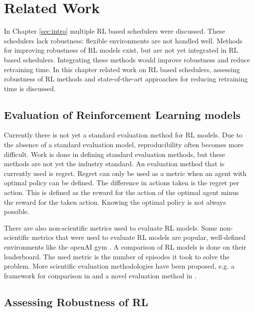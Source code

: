 \chapter{Related Work}

In Chapter \ref{sec:intro} multiple RL based schedulers were discussed. These
schedulers lack robustness: flexible environments are not handled well.
Methods for improving robustness of RL models exist, but are not yet
integrated in RL based schedulers. Integrating these methods would improve
robustness and reduce retraining time. In this chapter related work on RL
based schedulers, assessing robustness of RL methods and state-of-the-art
approaches for reducing retraining time is discussed.




\section{Evaluation of Reinforcement Learning models}

Currently there is not yet a standard evaluation method for RL models. Due to
the absence of a standard evaluation model, reproducibility often becomes more
difficult. Work is done in defining standard evaluation methods, but these
methods are not yet the industry standard. An evaluation method that is
currently used is regret. Regret can only be used as a metric when an agent
with optimal policy can be defined. The difference in actions taken is the
regret per action. This is defined as the reward for the action of the optimal
agent minus the reward for the taken action. Knowing the optimal policy is not
always possible.

There are also non-scientific metrics used to evaluate RL models. Some
non-scientific metrics that were used to evaluate RL models are popular,
well-defined environments like the openAI gym \cite{gym2016}. A comparison of
RL models is done on their
leaderboard. The used metric
is the number of episodes it took to solve the problem. More scientific
evaluation methodologies have been proposed, e.g. a framework for comparison
in  and a novel evaluation method in .

\section{Assessing Robustness of RL}



